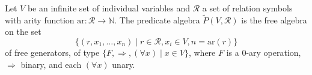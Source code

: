 Let $V$ be an infinite set of individual variables and $\mathcal{R}$ a set of relation symbols with arity function $\text{ar}:\mathcal{R} \to \mathbb{N}$. The predicate algebra $\tilde{P}(V, \mathcal{R})$ is the free algebra on the set
$$\{(r, x_1, \ldots, x_n) \mid r \in \mathcal{R}, x_i \in V, n = \text{ar}(r)\}$$
of free generators, of type $\{F, \Rightarrow, (\forall x) \mid x \in V\}$, where $F$ is a $0$-ary operation, $\Rightarrow$ binary, and each $(\forall x)$ unary.
